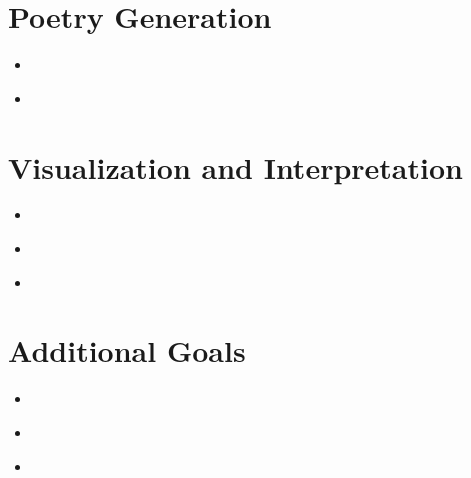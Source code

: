 \section{Poetry Generation}
\medskip
\begin{itemize}

    How did you generate your poem?
How did you get your poem to look as much like a sonnet as possible?
What makes sense/what doesn't about the sonnets generated?

    \item {} \\

    \item {} \\

\end{itemize}



\section{Visualization and Interpretation}
\medskip
\begin{itemize}
    For at least 5 hidden states give a list of the top 10 words that associate with this hidden state and
state any common features these groups.
What are some properties of the different hidden states?
e.g. Correlation between hidden states and syllable counts, connotations of words, etc.
Make a visual representation of the correlation between states and words

    \item {} \\

    \item {} \\

    \item {} \\

\end{itemize}


\section{Additional Goals}
\medskip
\begin{itemize}
    e.g. rhyme/meter

    \item {} \\

    \item {} \\

    \item {} \\

\end{itemize}



